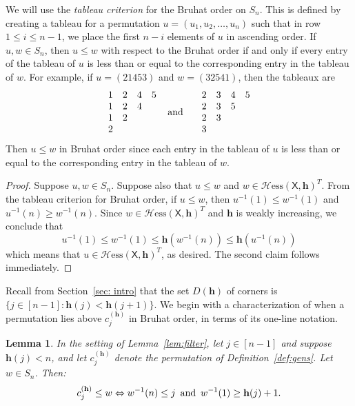 \documentclass[11pt]{amsart}
\theoremstyle{plain}
\newtheorem{lem}[thm]{Lemma}
\theoremstyle{definition}
\newcommand{\Hess}{\mathcal{H}\mathrm{ess}}
\newcommand{\mx}{\mathsf{X}}
\newcommand{\hess}{{\mathbf h}}
\numberwithin{equation}{section}
\begin{document}
We will use the \emph{tableau criterion} \cite[Theorem~2.6.3]{BjornerBrenti2005} for the Bruhat order 
on $S_n$. This is defined by creating a tableau for a permutation
$u = (u_1,u_2,\ldots,u_n)$ such that in row $1 \leq i \leq n-1$,
we place the first $n-i$ elements of $u$ in ascending order.  
If $u,w \in S_n$, 
then $u \leq w$ with respect to the Bruhat order if and only if every entry
of the tableau of $u$ is less than or equal to the corresponding entry in
the tableau of $w$. For example, if $u = (21453)$ and $w=(32541)$, then
the tableaux are 
\[
\begin{array}{cccc}
1&2&4&5 \\
1&2&4& \\
1&2& & \\
2 &&&
\end{array}~~\mbox{and}\hspace{.5cm}
\begin{array}{cccc}
2&3&4&5 \\
2&3&5& \\
2&3& & \\
3 &&&
\end{array}
\]
Then $u \leq w$ in Bruhat order since each entry in the tableau of $u$ is less than or equal to the corresponding entry in the tableau of $w$. 





\begin{proof}
Suppose $u, w \in S_n$.  Suppose also that $u\leq w$ and $w \in \Hess(\mx,\hess)^T$. From the tableau criterion for Bruhat order, if $u \leq w$, then $u^{-1}(1)\le w^{-1}(1)$ and $u^{-1}(n)\geq w^{-1}(n)$.  Since $w \in \Hess(\mx,\hess)^T$ and $\hess$ is weakly increasing, we conclude that 
\[u^{-1}(1)\leq w^{-1}(1)\leq \hess(w^{-1}(n))\leq\hess(u^{-1}(n))\]
which means that $u\in\Hess(\mx,\hess)^T$, as desired. The second claim follows immediately. 
\end{proof}

Recall from Section~\ref{sec: intro} that the set $D(\hess)$ of corners is $\{ j\in[n-1]: \hess(j)<\hess(j+1)\}$. We begin with a characterization of when a permutation lies above $c_j^{(\hess)}$ in Bruhat order, in terms of its one-line notation. 


\begin{lem}\label{lemma: Bruhat bigger than c j hess}
In the setting of Lemma~\ref{lem:filter}, let $j \in [n-1]$ and suppose $\hess(j)<n$, and let $c_j^{(\hess)}$ denote the permutation of Definition~\ref{def:gens}. Let $w\in S_n$. Then:
\[
c_j^{(\hess)} \leq w \Leftrightarrow w^{-1}(n) \leq j \, \textup{ and } \, w^{-1}(1) \geq \hess(j) +1. 
\]
\end{lem}
\end{document}

